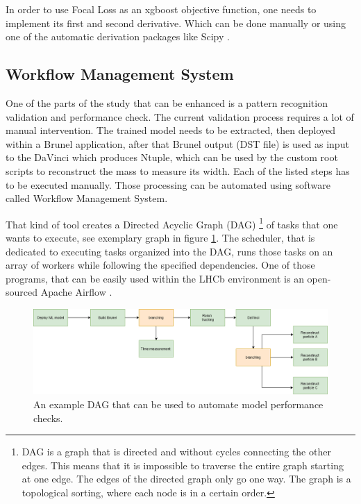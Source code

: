 In order to use Focal Loss as an xgboost objective function, one needs to implement its first and second derivative. Which can be done manually or using one of the automatic derivation packages like Scipy \cite{scipy}.   

\subsection{Workflow Management System}

One of the parts of the study that can be enhanced is a pattern recognition validation and performance check. 
The current validation process requires a lot of manual intervention. The trained model needs to be extracted, then deployed within a Brunel application, after that Brunel output (DST file) is used as input to the DaVinci which produces Ntuple, which can be used by the custom root scripts to reconstruct the mass to measure its width. Each of the listed steps has to be executed manually. Those processing can be automated using software called Workflow Management System. 

That kind of tool creates a Directed Acyclic Graph (DAG) \footnote{DAG is a graph that is directed and without cycles connecting the other edges. This means that it is impossible to traverse the entire graph starting at one edge. The edges of the directed graph only go one way. The graph is a topological sorting, where each node is in a certain order.} of tasks that one wants to execute, see exemplary graph in figure \ref{fig:DAG}. The scheduler, that is dedicated to executing tasks organized into the DAG, runs those tasks on an array of workers while following the specified dependencies. One of those programs, that can be easily used within the LHCb environment is an open-sourced Apache Airflow \cite{airflow}.


\begin{figure}[!h]
\centering
\includegraphics[scale=0.8]{figures/Upgrade_wokflow.png}
\caption{An example DAG that can be used to automate model performance checks. 
\label{fig:DAG}}
\end{figure}